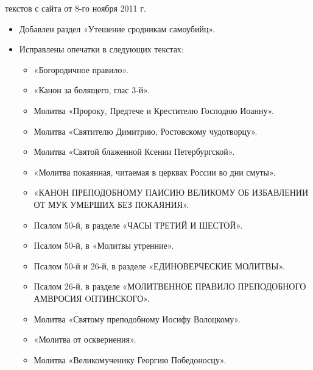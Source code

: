 
{ текстов с сайта от 8-го ноября 2011 г.

\begin{itemize}

\item Добавлен раздел «Утешение сродникам самоубийц».
\item Исправлены опечатки в следующих текстах:

\begin{itemize}

\item «Богородичное правило».
\item «Канон за болящего, глас 3-й».
\item Молитва «Пророку, Предтече и Крестителю Господню Иоанну».
\item Молитва «Святителю Димитрию, Ростовскому чудотворцу».
\item Молитва «Святой блаженной Ксении Петербургской».
\item «Молитва покаянная, читаемая в церквах России во дни смуты».
\item «КАНОН ПРЕПОДОБНОМУ ПАИСИЮ ВЕЛИКОМУ ОБ ИЗБАВЛЕНИИ ОТ МУК УМЕРШИХ БЕЗ ПОКАЯНИЯ».
\item Псалом 50-й, в разделе «ЧАСЫ ТРЕТИЙ И ШЕСТОЙ».
\item Псалом 50-й, в «Молитвы утренние».
\item Псалом 50-й и 26-й, в разделе «ЕДИНОВЕРЧЕСКИЕ МОЛИТВЫ».
\item Псалом 26-й, в разделе «МОЛИТВЕННОЕ ПРАВИЛО ПРЕПОДОБНОГО АМВРОСИЯ OПТИНСКОГО».
\item Молитва «Святому преподобному Иосифу Волоцкому».
\item «Молитва от осквернения».
\item Молитва «Великомученику Георгию Победоносцу».
\end{itemize}

\end{itemize}}


